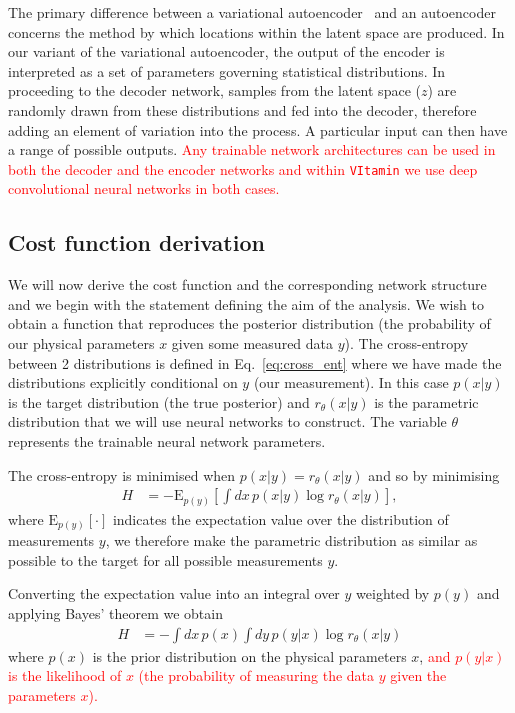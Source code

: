 \documentclass[%
showpacs,
nofootinbib,
 amsmath,amssymb,
 aps,
 twocolumn,
 prl,
 reprint,
floatfix,
]{revtex4-1}
\newcommand{\new}[1]{\textcolor{red}{#1}}
\begin{document}
%
%
The primary difference between a variational autoencoder~\cite{1812.04405} and
an autoencoder concerns the method by which locations within the latent space
are produced. In our variant of the variational autoencoder, the output of the
encoder is interpreted as a set of parameters governing statistical
distributions. In proceeding to the decoder network, samples from the latent
space ($z$) are randomly drawn from these distributions and fed into the
decoder, therefore adding an element of variation into the process. A
particular input can then have a range of possible outputs. \new{Any trainable
network architectures can be used in both the decoder and the encoder networks
and within \texttt{VItamin} we use deep convolutional neural networks in both
cases.}

\subsection{Cost function derivation}
%
%
We will now derive the cost function and the corresponding network structure
and we begin with the statement defining the aim of the analysis. We wish to
obtain a function that reproduces the posterior distribution (the probability
of our physical parameters $x$ given some measured data $y$). The cross-entropy
between 2 distributions is defined in Eq.~\ref{eq:cross_ent} where we have made
the distributions explicitly conditional on $y$ (our measurement). In this case
$p(x|y)$ is the target distribution (the true posterior) and $r_{\theta}(x|y)$
is the parametric distribution that we will use neural networks to construct.
The variable $\theta$ represents the trainable neural network parameters. 

%
%
The cross-entropy is minimised when $p(x|y)=r_{\theta}(x|y)$ and so by
minimising
%
\begin{align}\label{eq:cost1}
H &= -\text{E}_{p(y)}\left[\int dx\,p(x|y) \log r_{\theta}(x|y)\right],
\end{align}
% 
where $\text{E}_{p(y)}[\cdot]$ indicates the expectation value over the
distribution of measurements $y$, we therefore make the parametric distribution
as similar as possible to the target for all possible measurements $y$.

%
%
Converting the expectation value into an integral over $y$ weighted by $p(y)$
and applying Bayes' theorem we obtain
%
\begin{align}\label{eq:cost1}
H &= -\int dx\,p(x)\int dy\,p(y|x)\log r_{\theta}(x|y)
\end{align}
%
where $p(x)$ is the prior distribution on the physical parameters $x$, \new{and
$p(y|x)$ is the likelihood of $x$ (the probability of measuring the data $y$
given the parameters $x$).}
\end{document}

